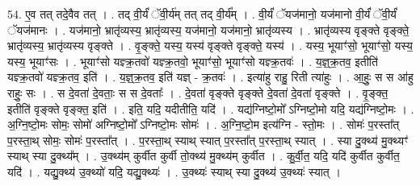 \documentclass[17pt]{extarticle}
\begin{document}
54. ए॒व तत् तदे॒वैव तत् । . तद् वी॒र्यं॑ ॅवी॒र्य॑म् तत् तद् वी॒र्य᳚म् । . वी॒र्यं॑ ॅयज॑मानो॒ यज॑मानो वी॒र्यं॑ ॅवी॒र्यं॑ ॅयज॑मानः । . यज॑मानो॒ भ्रातृ॑व्यस्य॒ भ्रातृ॑व्यस्य॒ यज॑मानो॒ यज॑मानो॒ भ्रातृ॑व्यस्य । . भ्रातृ॑व्यस्य वृङ्क्ते वृङ्क्ते॒ भ्रातृ॑व्यस्य॒ भ्रातृ॑व्यस्य वृङ्क्ते । . वृ॒ङ्क्ते॒ यस्य॒ यस्य॑ वृङ्क्ते वृङ्क्ते॒ यस्य॑ । . यस्य॒ भूयाꣳ॑सो॒ भूयाꣳ॑सो॒ यस्य॒ यस्य॒ भूयाꣳ॑सः । . भूयाꣳ॑सो यज्ञ्क्र॒तवो॑ यज्ञ्क्र॒तवो॒ भूयाꣳ॑सो॒ भूयाꣳ॑सो यज्ञ्क्र॒तवः॑ । . य॒ज्ञ्॒क्र॒तव॒ इतीति॑ यज्ञ्क्र॒तवो॑ यज्ञ्क्र॒तव॒ इति॑ । . य॒ज्ञ्॒क्र॒तव॒ इति॑ यज्ञ् - क्र॒तवः॑ । . इत्या॑हु राहु॒ रिती त्या॑हुः । . आ॒हुः॒ स स आ॑हु राहुः॒ सः । . स दे॒वता॑ दे॒वताः॒ स स दे॒वताः᳚ । . दे॒वता॑ वृङ्क्ते वृङ्क्ते दे॒वता॑ दे॒वता॑ वृङ्क्ते । . वृ॒ङ्क्त॒ इतीति॑ वृङ्क्ते वृङ्क्त॒ इति॑ । . इति॒ यदि॒ यदीतीति॒ यदि॑ । . यद्य॑ग्निष्टो॒मो᳚ ऽग्निष्टो॒मो यदि॒ यद्य॑ग्निष्टो॒मः । . अ॒ग्नि॒ष्टो॒मः सोमः॒ सोमो॑ अग्निष्टो॒मो᳚ ऽग्निष्टो॒मः सोमः॑ । . अ॒ग्नि॒ष्टो॒म इत्य॑ग्नि - स्तो॒मः । . सोमः॑ प॒रस्ता᳚त् प॒रस्ता॒थ् सोमः॒ सोमः॑ प॒रस्ता᳚त् । . प॒रस्ता॒थ् स्याथ् स्यात् प॒रस्ता᳚त् प॒रस्ता॒थ् स्यात् । . स्या दु॒क्थ्य॑ मु॒क्थ्यꣳ॑ स्याथ् स्या दु॒क्थ्य᳚म् । . उ॒क्थ्य॑म् कुर्वीत कुर्वी तो॒क्थ्य॑ मु॒क्थ्य॑म् कुर्वीत । . कु॒र्वी॒त॒ यदि॒ यदि॑ कुर्वीत कुर्वीत॒ यदि॑ । . यद्यु॒क्थ्य॑ उ॒क्थ्यो॑ यदि॒ यद्यु॒क्थ्यः॑ । . उ॒क्थ्यः॑ स्याथ् स्या दु॒क्थ्य॑ उ॒क्थ्यः॑ स्यात् । \newline
\end{document}
